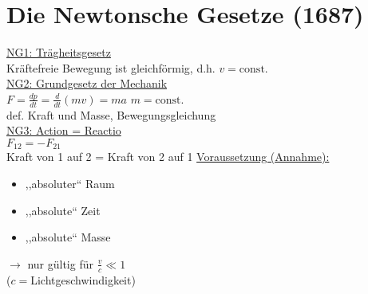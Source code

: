 \documentclass[titlepage,12pt,a4paper,ngerman]{report}
\newcommand{\tx}[1]{\textrm{#1}}
\newcommand{\const}{\tx{const.}}
\begin{document}
\section{Die Newtonsche Gesetze (1687)} %
{\large\underline{NG1: Trägheitsgesetz}}\\
Kräftefreie Bewegung ist gleichförmig, d.h. $v = \const$\\
{\large\underline{NG2: Grundgesetz der Mechanik}}\\
$ F = \frac{dp}{dt} = \frac{d}{dt}(mv) = ma$ $m = \const$\\
def. Kraft und Masse, Bewegungsgleichung\\
{\large\underline{NG3: Action = Reactio}}\\
$F_{12} = -F_{21}$\\
Kraft von 1 auf 2 = Kraft von 2 auf 1
{\large \underline{Voraussetzung (Annahme):}}
\begin{itemize}
	\item ,,absoluter`` Raum
	\item ,,absolute`` Zeit
	\item ,,absolute`` Masse
\end{itemize}
$\rightarrow$ nur gültig für $\frac{v}{c} \ll 1$\\
($c = $Lichtgeschwindigkeit)\\
\end{document}
